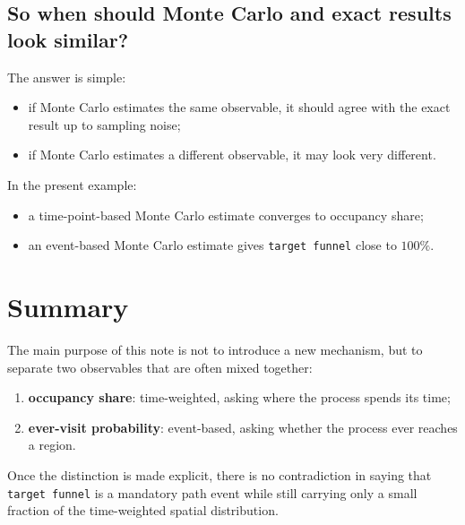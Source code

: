 \documentclass[11pt]{article}
\begin{document}
\subsection{So when should Monte Carlo and exact results look similar?}
The answer is simple:
\begin{itemize}
  \item if Monte Carlo estimates the same observable, it should agree with the exact result up to sampling noise;
  \item if Monte Carlo estimates a different observable, it may look very different.
\end{itemize}

In the present example:
\begin{itemize}
  \item a time-point-based Monte Carlo estimate converges to occupancy share;
  \item an event-based Monte Carlo estimate gives \texttt{target funnel} close to $100\%$.
\end{itemize}

\section*{Summary}
The main purpose of this note is not to introduce a new mechanism, but to separate two observables that are often mixed together:
\begin{enumerate}
  \item \textbf{occupancy share}: time-weighted, asking where the process spends its time;
  \item \textbf{ever-visit probability}: event-based, asking whether the process ever reaches a region.
\end{enumerate}
Once the distinction is made explicit, there is no contradiction in saying that \texttt{target funnel} is a mandatory path event while still carrying only a small fraction of the time-weighted spatial distribution.
\end{document}
